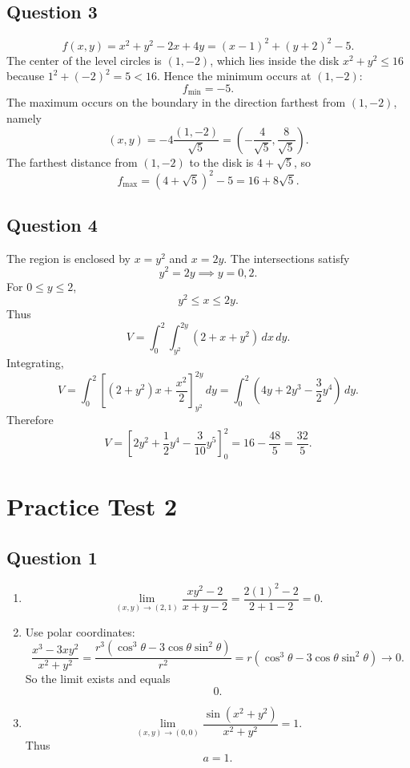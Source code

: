 \documentclass[11pt]{article}
\begin{document}
\subsection*{Question 3}
\[
f(x,y)=x^2+y^2-2x+4y=(x-1)^2+(y+2)^2-5.
\]
The center of the level circles is $(1,-2)$, which lies inside the disk $x^2+y^2\le 16$ because $1^2+(-2)^2=5<16$.
Hence the minimum occurs at $(1,-2)$:
\[
\boxed{f_{\min}=-5}.
\]
The maximum occurs on the boundary in the direction farthest from $(1,-2)$, namely
\[
(x,y)=-4\frac{(1,-2)}{\sqrt5}=\left(-\frac4{\sqrt5},\frac8{\sqrt5}\right).
\]
The farthest distance from $(1,-2)$ to the disk is $4+\sqrt5$, so
\[
f_{\max}=(4+\sqrt5)^2-5=\boxed{16+8\sqrt5}.
\]

\subsection*{Question 4}
The region is enclosed by $x=y^2$ and $x=2y$. The intersections satisfy
\[
y^2=2y \implies y=0,2.
\]
For $0\le y\le 2$,
\[
y^2\le x\le 2y.
\]
Thus
\[
V=\int_0^2\int_{y^2}^{2y}(2+x+y^2)\,dx\,dy.
\]
Integrating,
\[
V=\int_0^2\left[(2+y^2)x+\frac{x^2}{2}\right]_{y^2}^{2y}\,dy
=\int_0^2\left(4y+2y^3-\frac32y^4\right)\,dy.
\]
Therefore
\[
V=\left[2y^2+\frac12y^4-\frac3{10}y^5\right]_0^2
=16-\frac{48}{5}
=\boxed{\frac{32}{5}}.
\]

\section*{Practice Test 2}

\subsection*{Question 1}
\begin{enumerate}[label=\alph*)]
\item
\[
\lim_{(x,y)\to(2,1)}\frac{xy^2-2}{x+y-2}
=\frac{2(1)^2-2}{2+1-2}
=\boxed{0}.
\]

\item
Use polar coordinates:
\[
\frac{x^3-3xy^2}{x^2+y^2}
=\frac{r^3(\cos^3\theta-3\cos\theta\sin^2\theta)}{r^2}
=r(\cos^3\theta-3\cos\theta\sin^2\theta)\to 0.
\]
So the limit exists and equals
\[
\boxed{0}.
\]

\item
\[
\lim_{(x,y)\to(0,0)}\frac{\sin(x^2+y^2)}{x^2+y^2}=1.
\]
Thus
\[
\boxed{a=1}.
\]
\end{enumerate}
\end{document}
